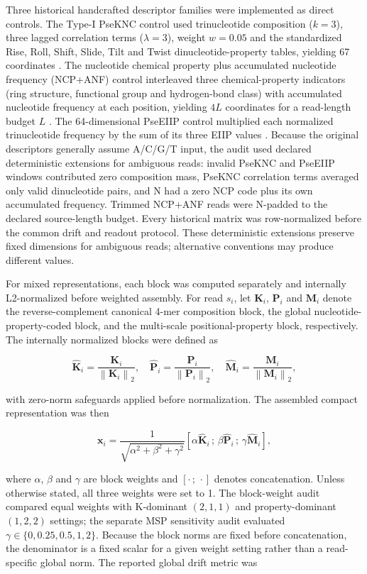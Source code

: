 Three historical handcrafted descriptor families were implemented as direct controls. The Type-I PseKNC control used trinucleotide composition ($k=3$), three lagged correlation terms ($\lambda=3$), weight $w=0.05$ and the standardized Rise, Roll, Shift, Slide, Tilt and Twist dinucleotide-property tables, yielding 67 coordinates \citep{Chen2014PseKNC,Chen2015PseKNCGeneral}. The nucleotide chemical property plus accumulated nucleotide frequency (NCP+ANF) control interleaved three chemical-property indicators (ring structure, functional group and hydrogen-bond class) with accumulated nucleotide frequency at each position, yielding $4L$ coordinates for a read-length budget $L$ \citep{Chen2017iDNA4mC}. The 64-dimensional PseEIIP control multiplied each normalized trinucleotide frequency by the sum of its three EIIP values \citep{Nair2006,He2018PseEIIP}. Because the original descriptors generally assume A/C/G/T input, the audit used declared deterministic extensions for ambiguous reads: invalid PseKNC and PseEIIP windows contributed zero composition mass, PseKNC correlation terms averaged only valid dinucleotide pairs, and N had a zero NCP code plus its own accumulated frequency. Trimmed NCP+ANF reads were N-padded to the declared source-length budget. Every historical matrix was row-normalized before the common drift and readout protocol. These deterministic extensions preserve fixed dimensions for ambiguous reads; alternative conventions may produce different values.

For mixed representations, each block was computed separately and internally L2-normalized before weighted assembly. For read $s_i$, let $\mathbf{K}_i$, $\mathbf{P}_i$ and $\mathbf{M}_i$ denote the reverse-complement canonical 4-mer composition block, the global nucleotide-property-coded block, and the multi-scale positional-property block, respectively. The internally normalized blocks were defined as

\[
\hat{\mathbf{K}}_i=\frac{\mathbf{K}_i}{\left\|\mathbf{K}_i\right\|_2},\quad
\hat{\mathbf{P}}_i=\frac{\mathbf{P}_i}{\left\|\mathbf{P}_i\right\|_2},\quad
\hat{\mathbf{M}}_i=\frac{\mathbf{M}_i}{\left\|\mathbf{M}_i\right\|_2},
\]

with zero-norm safeguards applied before normalization. The assembled compact representation was then

\[
\mathbf{x}_i
=
\frac{1}{\sqrt{\alpha^2+\beta^2+\gamma^2}}
\left[\alpha \hat{\mathbf{K}}_i \,;\, \beta \hat{\mathbf{P}}_i \,;\, \gamma \hat{\mathbf{M}}_i\right],
\]

where $\alpha$, $\beta$ and $\gamma$ are block weights and $[\cdot\,;\,\cdot]$ denotes concatenation. Unless otherwise stated, all three weights were set to 1. The block-weight audit compared equal weights with K-dominant $(2,1,1)$ and property-dominant $(1,2,2)$ settings; the separate MSP sensitivity audit evaluated $\gamma\in\{0,0.25,0.5,1,2\}$. Because the block norms are fixed before concatenation, the denominator is a fixed scalar for a given weight setting rather than a read-specific global norm. The reported global drift metric was

